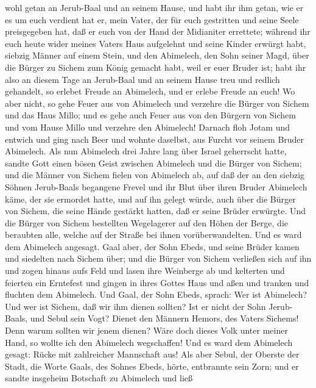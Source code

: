 wohl getan an Jerub-Baal und an seinem Hause, und habt ihr ihm getan,
wie er es um euch verdient hat  er, mein Vater, der für
euch gestritten und seine Seele preisgegeben hat, daß er euch von der
Hand der Midianiter errettete;  während ihr euch heute
wider meines Vaters Haus aufgelehnt und seine Kinder erwürgt habt,
siebzig Männer auf einem Stein, und den Abimelech, den Sohn seiner Magd,
über die Bürger zu Sichem zum König gemacht habt, weil er euer Bruder
ist;  habt ihr also an diesem Tage an Jerub-Baal und an
seinem Hause treu und redlich gehandelt, so erlebet Freude an Abimelech,
und er erlebe Freude an euch!  Wo aber nicht, so gehe
Feuer aus von Abimelech und verzehre die Bürger von Sichem und das Haus
Millo; und es gehe auch Feuer aus von den Bürgern von Sichem und vom
Hause Millo und verzehre den Abimelech!  Darnach floh
Jotam und entwich und ging nach Beer und wohnte daselbst, aus Furcht vor
seinem Bruder Abimelech.  Als nun Abimelech drei Jahre
lang über Israel geherrscht hatte,  sandte Gott einen
bösen Geist zwischen Abimelech und die Bürger von Sichem; und die Männer
von Sichem fielen von Abimelech ab,  auf daß der an den
siebzig Söhnen Jerub-Baals begangene Frevel und ihr Blut über ihren
Bruder Abimelech käme, der sie ermordet hatte, und auf ihn gelegt würde,
auch über die Bürger von Sichem, die seine Hände gestärkt hatten, daß er
seine Brüder erwürgte.  Und die Bürger von Sichem
bestellten Wegelagerer auf den Höhen der Berge, die beraubten alle,
welche auf der Straße bei ihnen vorüberwandelten. Und es ward dem
Abimelech angesagt.  Gaal aber, der Sohn Ebeds, und seine
Brüder kamen und siedelten nach Sichem über; und die Bürger von Sichem
verließen sich auf ihn  und zogen hinaus aufs Feld und
lasen ihre Weinberge ab und kelterten und feierten ein Erntefest und
gingen in ihres Gottes Haus und aßen und tranken und fluchten dem
Abimelech.  Und Gaal, der Sohn Ebeds, sprach: Wer ist
Abimelech? Und wer ist Sichem, daß wir ihm dienen sollten? Ist er nicht
der Sohn Jerub-Baals, und Sebul sein Vogt? Dienet den Männern Hemors,
des Vaters Sichems! Denn warum sollten wir jenem dienen? 
Wäre doch dieses Volk unter meiner Hand, so wollte ich den Abimelech
wegschaffen! Und es ward dem Abimelech gesagt: Rücke mit zahlreicher
Mannschaft aus!  Als aber Sebul, der Oberste der Stadt,
die Worte Gaals, des Sohnes Ebeds, hörte, entbrannte sein Zorn;
 und er sandte insgeheim Botschaft zu Abimelech und ließ
